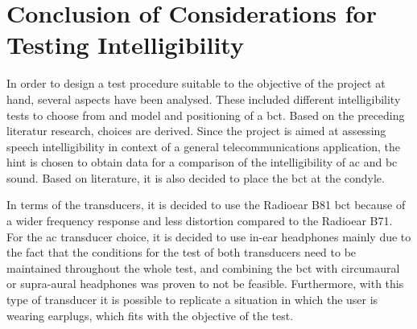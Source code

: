 \section{Conclusion of Considerations for Testing Intelligibility}
In order to design a test procedure suitable to the objective of the project at hand, several aspects have been analysed. These included different intelligibility tests to choose from and model and positioning of a \gls{bct}.
Based on the preceding literatur research, choices are derived.
Since the project is aimed at assessing speech intelligibility in context of a general telecommunications application, the \gls{hint} is chosen to obtain data for a  comparison of the intelligibility of \gls{ac} and \gls{bc} sound.
Based on literature, it is also decided to place the \gls{bct} at the condyle.


In terms of the transducers, it is decided to use the Radioear B81 \gls{bct} because of a wider frequency response and less distortion compared to the Radioear B71. For the \gls{ac} transducer choice, it is decided to use in-ear headphones mainly due to the fact that the conditions for the test of both transducers need to be maintained throughout the whole test, and combining the \gls{bct} with circumaural or supra-aural headphones was proven to not be feasible. Furthermore, with this type of transducer it is possible to replicate a situation in which the user is wearing earplugs, which fits with the objective of the test.